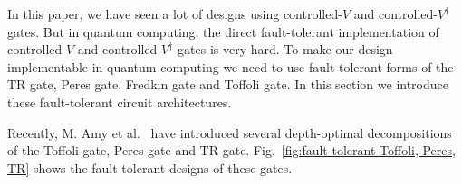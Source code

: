 \documentclass[%
reprint,
 amsmath,amssymb,
 aps,
]{revtex4-1}
\begin{document}
In this paper, we have seen a lot of designs using controlled-$V$ and controlled-$V^\dag$ gates. But in quantum computing, the direct fault-tolerant implementation of controlled-$V$ and controlled-$V^\dag$ gates is very hard. To make our design implementable in quantum computing we need to use fault-tolerant forms of the TR gate, Peres gate, Fredkin gate and Toffoli gate. In this section we introduce these fault-tolerant circuit architectures. 

\par Recently, M. Amy et al.~\cite{fast-synthesis} have introduced several depth-optimal decompositions of the Toffoli gate, Peres gate and TR gate. Fig.~\ref{fig:fault-tolerant Toffoli, Peres, TR} shows the fault-tolerant designs of these gates.  
 
 
\begin{figure}[h]







\end{figure}
\end{document}
